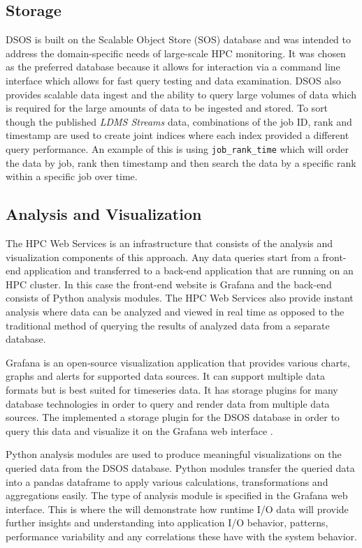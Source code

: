\documentclass[conference]{IEEEtran}
\begin{document}
\subsection{Storage}
DSOS is built on the Scalable Object Store (SOS) database  and was intended to address the domain-specific needs of large-scale HPC monitoring. It was chosen as the preferred database because it allows for interaction via a command line interface which allows for fast query testing and data examination. DSOS also provides scalable data ingest and the ability to query large volumes of data which is required for the large amounts of data to be ingested and stored. %
To sort though the published \emph{LDMS Streams} data, combinations of the job ID, rank and timestamp are used to create joint indices where each index provided a different query performance. An example of this is using \texttt{job\_rank\_time} which will order the data by job, rank then timestamp and then search the data by a specific rank within a specific job over time.

\subsection{Analysis and Visualization}
The HPC Web Services  is an infrastructure that consists of the analysis and visualization components of this approach. Any data queries start from a front-end application and transferred to a back-end application that are running on an HPC cluster. In this case the front-end website is Grafana  and the back-end consists of Python analysis modules. The HPC Web Services also provide instant analysis where data can be analyzed and viewed in real time as opposed to the traditional method of querying the results of analyzed data from a separate database.

Grafana is an open-source visualization application that provides various charts, graphs and alerts for supported data sources. It can support multiple data formats but is best suited for timeseries data. It has storage plugins for many database technologies in order to query and render data from multiple data sources. The \Darshan implemented a storage plugin for the DSOS database in order to query this data and visualize it on the Grafana web interface . 

Python analysis modules are used to produce meaningful visualizations on the queried data from the DSOS database. Python modules transfer the queried data into a pandas dataframe  to apply various calculations, transformations and aggregations easily. The type of analysis module is specified in the Grafana web interface. This is where the \Darshan will demonstrate how runtime I/O data will provide further insights and understanding into application I/O behavior, patterns, performance variability and any correlations these have with the system behavior.   
\end{document}
